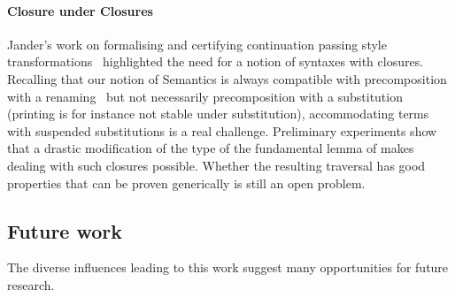 {\paragraph{Closure under Closures} Jander's work on formalising and certifying
continuation passing style transformations~\cite{Jander:Thesis:2019}
highlighted the need for a notion of syntaxes with closures. Recalling
that our notion of Semantics is always compatible with precomposition
with a renaming~\cite{Kaiser-wsdebr} but not necessarily
precomposition with a substitution (printing is for instance not
stable under substitution), accommodating terms with suspended
substitutions is a real challenge. Preliminary experiments show that a
drastic modification of the type of the fundamental lemma of
 makes dealing with such closures possible. Whether the
resulting traversal has good properties that can be proven generically
is still an open problem.

\subsection{Future work}

The diverse influences leading to this work suggest many opportunities for
future research.

}
